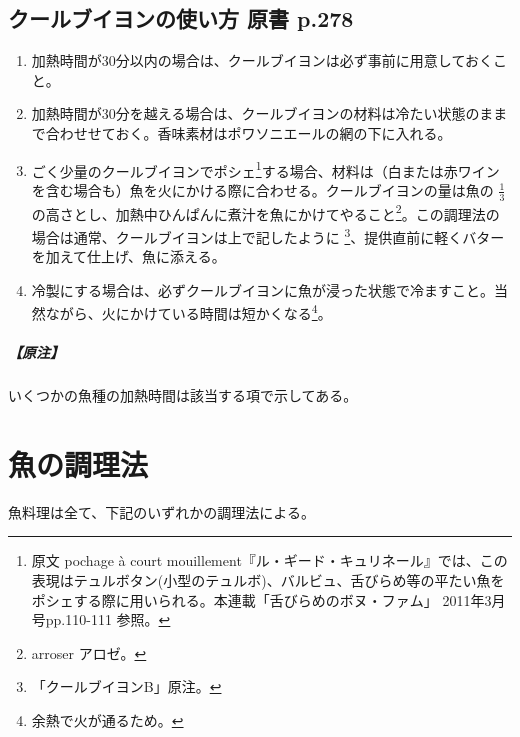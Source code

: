 \hypertarget{ux30afux30fcux30ebux30d6ux30a4ux30e8ux30f3ux306eux4f7fux3044ux65b9-ux539fux66f8-p.278}{%
\subsection{クールブイヨンの使い方 原書
p.278}\label{ux30afux30fcux30ebux30d6ux30a4ux30e8ux30f3ux306eux4f7fux3044ux65b9-ux539fux66f8-p.278}}

\begin{enumerate}
\def\labelenumi{\arabic{enumi}.}
\item
  加熱時間が30分以内の場合は、クールブイヨンは必ず事前に用意しておくこと。
\item
  加熱時間が30分を越える場合は、クールブイヨンの材料は冷たい状態のままで合わせせておく。香味素材はポワソニエールの網の下に入れる。
\item
  ごく少量のクールブイヨンでポシェ\footnote{原文 pochage à court
    mouillement『ル・ギード・キュリネール』では、この表現はテュルボタン(小型のテュルボ)、バルビュ、舌びらめ等の平たい魚をポシェする際に用いられる。本連載「舌びらめのボヌ・ファム」
    2011年3月号pp.110-111 参照。}する場合、材料は（白または赤ワインを含む場合も）魚を火にかける際に合わせる。クールブイヨンの量は魚の
  \(\frac{1}{3}\)
  の高さとし、加熱中ひんぱんに煮汁を魚にかけてやること\footnote{arroser
    アロゼ。}。この調理法の場合は通常、クールブイヨンは上で記したように
  \footnote{「クールブイヨンB」原注。}、提供直前に軽くバターを加えて仕上げ、魚に添える。
\item
  冷製にする場合は、必ずクールブイヨンに魚が浸った状態で冷ますこと。当然ながら、火にかけている時間は短かくなる\footnote{余熱で火が通るため。}。
\end{enumerate}

\hypertarget{ux539fux6ce8}{%
\subparagraph{【原注】}\label{ux539fux6ce8}}

いくつかの魚種の加熱時間は該当する項で示してある。

\hypertarget{ux9b5aux306eux8abfux7406ux6cd5}{%
\section{魚の調理法}\label{ux9b5aux306eux8abfux7406ux6cd5}}

魚料理は全て、下記のいずれかの調理法による。

